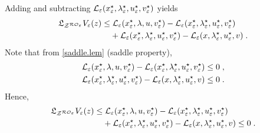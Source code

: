 \documentclass[journal,twoside,web]{ieeecolor}
\begin{document}
Adding and subtracting ${\cal L}_\varepsilon(x_\varepsilon^\star,\lambda_\varepsilon^\star,u_\varepsilon^\star,v_\varepsilon^\star)$ yields
\begin{align} \label{deriv_v}
\mathfrak{L}_{{\cal Z}^{{\cal RO}_\varepsilon}}V_\varepsilon(z)\leq&\; {\cal L}_\varepsilon(x_\varepsilon^\star,\lambda,u,v_\varepsilon^\star)-{\cal L}_\varepsilon(x_\varepsilon^\star,\lambda_\varepsilon^\star,u_\varepsilon^\star,v_\varepsilon^\star)\\
&+{\cal L}_\varepsilon(x_\varepsilon^\star,\lambda_\varepsilon^\star,u_\varepsilon^\star,v_\varepsilon^\star)-{\cal L}_\varepsilon(x,\lambda_\varepsilon^\star,u_\varepsilon^\star,v) \;.\nonumber
\end{align}
Note that from \ref{saddle.lem} (saddle property),
\begin{align*}{\cal L}_\varepsilon(x_\varepsilon^\star,\lambda,u,v_\varepsilon^\star)-{\cal L}_\varepsilon(x_\varepsilon^\star,\lambda_\varepsilon^\star,u_\varepsilon^\star,v_\varepsilon^\star)\leq 0\;,
\\
{\cal L}_\varepsilon(x_\varepsilon^\star,\lambda_\varepsilon^\star,u_\varepsilon^\star,v_\varepsilon^\star)-{\cal L}_\varepsilon(x,\lambda_\varepsilon^\star,u_\varepsilon^\star,v)\leq 0\;.
\end{align*}
Hence, 
\begin{align} \label{deriv_v2}
\mathfrak{L}_{{\cal Z}^{{\cal RO}_\varepsilon}}V_\varepsilon(z)\leq&\; {\cal L}_\varepsilon(x_\varepsilon^\star,\lambda,u,v_\varepsilon^\star)-{\cal L}_\varepsilon(x_\varepsilon^\star,\lambda_\varepsilon^\star,u_\varepsilon^\star,v_\varepsilon^\star)\\
&+{\cal L}_\varepsilon(x_\varepsilon^\star,\lambda_\varepsilon^\star,u_\varepsilon^\star,v_\varepsilon^\star)-{\cal L}_\varepsilon(x,\lambda_\varepsilon^\star,u_\varepsilon^\star,v)\leq 0 \;.\nonumber
\end{align}
\fi
\iffalse
\end{document}
